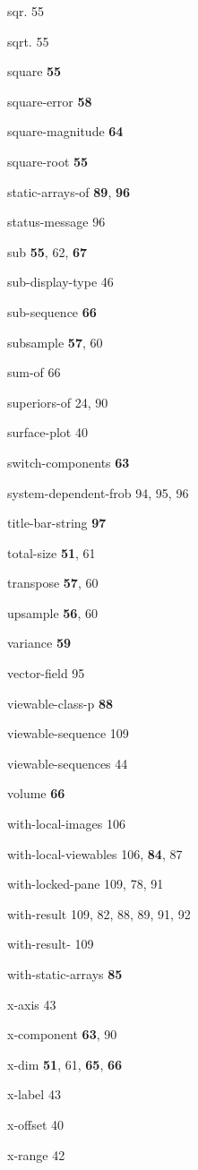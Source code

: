 \begin{theindex}
\item sqr. 55
\item sqrt. 55
\item square {\bf 55}
\item square-error {\bf 58}
\item square-magnitude {\bf 64}
\item square-root {\bf 55}
\item static-arrays-of {\bf 89}, {\bf 96}
\item status-message 96
\item sub {\bf 55}, 62, {\bf 67}
\item sub-display-type 46
\item sub-sequence {\bf 66}
\item subsample {\bf 57}, 60
\item sum-of 66
\item superiors-of 24, 90
\item surface-plot 40
\item switch-components {\bf 63}
\item system-dependent-frob 94, 95, 96
\item title-bar-string {\bf 97}
\item total-size {\bf 51}, 61
\item transpose {\bf 57}, 60
\item upsample {\bf 56}, 60
\item variance {\bf 59}
\item vector-field 95
\item viewable-class-p {\bf 88}
\item viewable-sequence 109
\item viewable-sequences 44
\item volume {\bf 66}
\item with-local-images 106
\item with-local-viewables 106, {\bf 84}, 87
\item with-locked-pane 109, 78, 91
\item with-result 109, 82, 88, 89, 91, 92
\item with-result- 109
\item with-static-arrays {\bf 85}
\item x-axis 43
\item x-component {\bf 63}, 90
\item x-dim {\bf 51}, 61, {\bf 65}, {\bf 66}
\item x-label 43
\item x-offset 40
\item x-range 42

\end{theindex}
